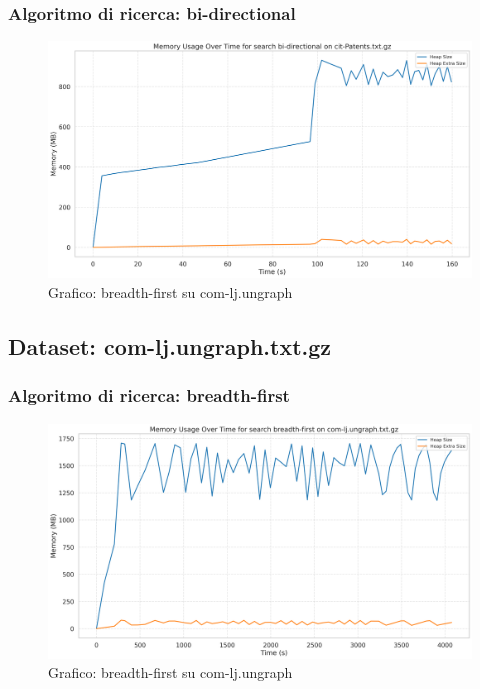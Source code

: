 \documentclass{article}
\begin{document}
\subsubsection{Algoritmo di ricerca: bi-directional}
\begin{figure}[h]\centering
\includegraphics[width=\textwidth]{../plots/cit-Patents_bi-directional.png}
\caption{Grafico: breadth-first su com-lj.ungraph}
\end{figure}
\subsection{Dataset: com-lj.ungraph.txt.gz}
\subsubsection{Algoritmo di ricerca: breadth-first}
\begin{figure}[h]\centering
\includegraphics[width=\textwidth]{../plots/com-lj.ungraph_breadth-first.png}
\caption{Grafico: breadth-first su com-lj.ungraph}
\end{figure}
\end{document}

